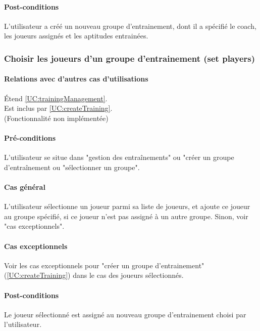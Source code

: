 \paragraph{Post-conditions}
\begin{list}{}{\leftmargin=1.5em}
\item{L'utilisateur a créé un nouveau groupe d'entrainement, dont il a spécifié le coach, les joueurs assignés et les aptitudes entrainées.}
\end{list}

\subsubsection{Choisir les joueurs d'un groupe d'entrainement (set players)}
\label{UC:addPlayerToGroup}
\paragraph{Relations avec d'autres cas d'utilisations}
Étend \ref{UC:trainingManagement}.\\
Est inclus par \ref{UC:createTraining}.
\\(Fonctionnalité non implémentée)
\paragraph{Pré-conditions}
\begin{list}{}{\leftmargin=1.5em}
\item{L'utilisateur se situe dans "gestion des entraînements" ou "créer un groupe d'entraînement ou "sélectionner un groupe".}
\end{list}
\paragraph{Cas général}
L'utilisateur sélectionne un joueur parmi sa liste de joueurs, et ajoute ce joueur au groupe spécifié, si ce joueur n'est pas assigné à un autre groupe. Sinon, voir "cas exceptionnels". 
\paragraph{Cas exceptionnels}
Voir les cas exceptionnels pour "créer un groupe d'entrainement" (\ref{UC:createTraining}) dans le cas des joueurs sélectionnés.
\paragraph{Post-conditions}
\begin{list}{}{\leftmargin=1.5em}
\item{Le joueur sélectionné est assigné au nouveau groupe d'entrainement choisi par l'utilisateur.}
\end{list}


